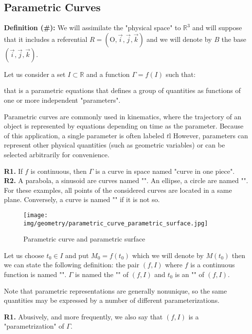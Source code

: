 {	\subsection{Parametric Curves}\label{parametric curves}
	\textbf{Definition (\#\mydef):} We will assimilate the "physical space" to $\mathbb{R}^3$ and will suppose that it includes a referential $R=(\text{O},\vec{i},\vec{j},\vec{k})$ and we will denote by $B$ the base $(\vec{i},\vec{j},\vec{k})$.
	
	Let us consider a set $I \subset \mathbb{R}$ and a function $\Gamma=f(I)$ such that:
	
	that is a parametric equations that defines a group of quantities as functions of one or more independent "parameters".
	
	Parametric curves are commonly used in kinematics, where the trajectory of an object is represented by equations depending on time as the parameter. Because of this application, a single parameter is often labeled $t$l However, parameters can represent other physical quantities (such as geometric variables) or can be selected arbitrarily for convenience.
	\begin{tcolorbox}[title=Remarks,colframe=black,arc=10pt]
	\textbf{R1.} If $f$ is continuous, then $\Gamma$ is a curve in space named "curve in one piece".\\
	
	\textbf{R2.} A parabola, a sinusoid are curves named  "". An ellipse, a circle are named "". For these examples, all points of the considered curves are located in a same plane. Conversely, a curve is named "" if it is not so.
	\end{tcolorbox}
	\begin{figure}[H]
		\centering
		\texttt{[image: img/geometry/parametric\_curve\_parametric\_surface.jpg]}
		\caption{Parametric curve and parametric surface}
	\end{figure}
	Let us choose $t_0 \in I$ and put $M_0=f(t_0)$ which we will denote by $M(t_0)$ then we can state the following definition: the pair $(f, I)$ where $f$ is a continuous function is named "". $\Gamma$ is named the "" of $(f, I)$ and $t_0$ is an "" of $(f, I)$.
	
	Note that parametric representations are generally nonunique, so the same quantities may be expressed by a number of different parameterizations.
	\begin{tcolorbox}[title=Remarks,colframe=black,arc=10pt]
	\textbf{R1.} Abusively, and more frequently, we also say that $(f, I)$ is a "parametrization" of $\Gamma$.\\
	

\end{tcolorbox}}

